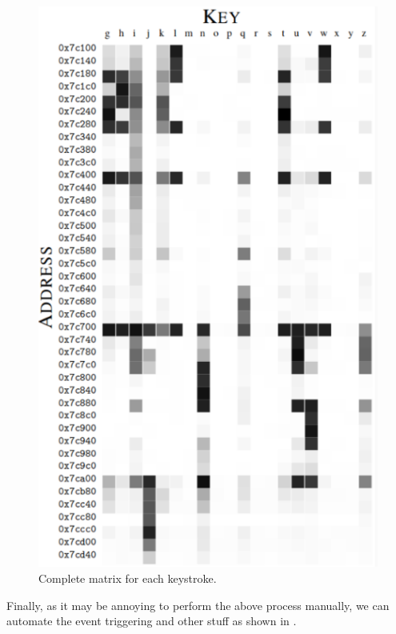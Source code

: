 \begin{figure}[h]
    \centering
    \includegraphics[width=\textwidth]{images/cache-keymap-matrix.png}
    \caption{Complete matrix for each keystroke.}
    \label{cache-keymap-matrix:fig}
\end{figure}

Finally, as it may be annoying to perform the above process manually, we can automate the event triggering and other stuff as shown in \cite{GitGruss}.
